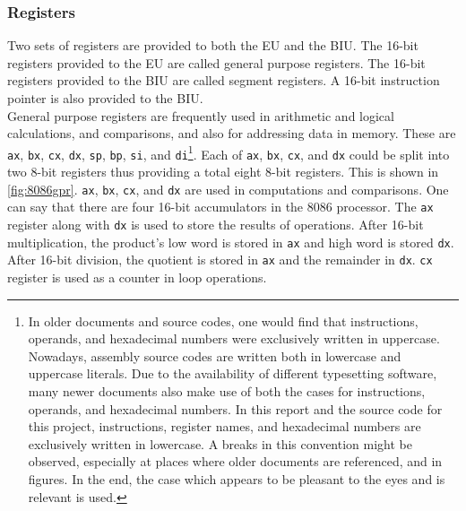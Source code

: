 \subsubsection{Registers}
Two sets of registers are provided to both the EU and the BIU. The 16-bit registers provided to the EU are called general purpose registers. The 16-bit registers provided to the BIU are called segment registers. A 16-bit instruction pointer is also provided to the BIU.\\
General purpose registers are frequently used in arithmetic and logical calculations, and comparisons, and also for addressing data in memory. These are \verb|ax|, \verb|bx|, \verb|cx|, \verb|dx|, \verb|sp|, \verb|bp|, \verb|si|, and \verb|di|\footnote[1]{In older documents and source codes, one would find that instructions, operands, and hexadecimal numbers were exclusively written in uppercase. Nowadays, assembly source codes are written both in lowercase and uppercase literals. Due to the availability of different typesetting software, many newer documents also make use of both the cases for instructions, operands, and hexadecimal numbers. In this report and the source code for this project, instructions, register names, and hexadecimal numbers are exclusively written in lowercase. A breaks in this convention might be observed, especially at places where older documents are referenced, and in figures. In the end, the case which appears to be pleasant to the eyes and is relevant is used.}. Each of \verb|ax|, \verb|bx|, \verb|cx|, and \verb|dx| could be split into two 8-bit registers thus providing a total eight 8-bit registers. This is shown in \autoref{fig:8086gpr}. \verb|ax|, \verb|bx|, \verb|cx|, and \verb|dx| are used in computations and comparisons. One can say that there are four 16-bit accumulators in the 8086 processor. The \verb|ax| register along with \verb|dx| is used to store the results of operations. After 16-bit multiplication, the product's low word is stored in \verb|ax| and high word is stored \verb|dx|. After 16-bit division, the quotient is stored in \verb|ax| and the remainder in \verb|dx|. \verb|cx| register is used as a counter in loop operations.\\
